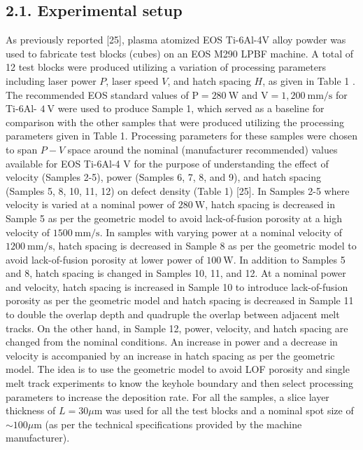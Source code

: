 \documentclass[10pt]{article}
\begin{document}
\subsection*{2.1. Experimental setup}
As previously reported [25], plasma atomized EOS Ti-6Al-4V alloy powder was used to fabricate test blocks (cubes) on an EOS M290 LPBF machine. A total of 12 test blocks were produced utilizing a variation of processing parameters including laser power $P$, laser speed $V$, and hatch spacing $H$, as given in Table 1 . The recommended EOS standard values of $\mathrm{P}=280 \mathrm{~W}$ and $\mathrm{V}=1,200 \mathrm{~mm} / \mathrm{s}$ for Ti-6Al- $4 \mathrm{~V}$ were used to produce Sample 1, which served as a baseline for comparison with the other samples that were produced utilizing the processing parameters given in Table 1. Processing parameters for these samples were chosen to span $P-V$ space around the nominal (manufacturer recommended) values available for EOS Ti-6Al-4 V for the purpose of understanding the effect of velocity (Samples 2-5), power (Samples 6, 7, 8, and 9), and hatch spacing (Samples 5, 8, 10, 11, 12) on defect density (Table 1) [25]. In Samples 2-5 where velocity is varied at a nominal power of $280 \mathrm{~W}$, hatch spacing is decreased in Sample 5 as per the geometric model to avoid lack-of-fusion porosity at a high velocity of $1500 \mathrm{~mm} / \mathrm{s}$. In samples with varying power at a nominal velocity of $1200 \mathrm{~mm} / \mathrm{s}$, hatch spacing is decreased in Sample 8 as per the geometric model to avoid lack-of-fusion porosity at lower power of $100 \mathrm{~W}$. In addition to Samples 5 and 8, hatch spacing is changed in Samples 10, 11, and 12. At a nominal power and velocity, hatch spacing is increased in Sample 10 to introduce lack-of-fusion porosity as per the geometric model and hatch spacing is decreased in Sample 11 to double the overlap depth and quadruple the overlap between adjacent melt tracks. On the other hand, in Sample 12, power, velocity, and hatch spacing are changed from the nominal conditions. An increase in power and a decrease in velocity is accompanied by an increase in hatch spacing as per the geometric model. The idea is to use the geometric model to avoid LOF porosity and single melt track experiments to know the keyhole boundary and then select processing parameters to increase the deposition rate. For all the samples, a slice layer thickness of $L=30 \mu \mathrm{m}$ was used for all the test blocks and a nominal spot size of $\sim 100 \mu \mathrm{m}$ (as per the technical specifications provided by the machine manufacturer).
\end{document}
